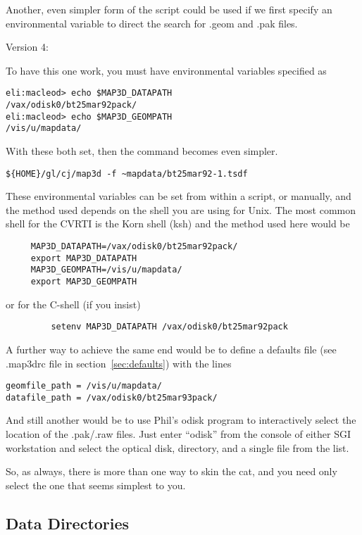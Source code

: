 Another, even simpler form of the script could be used if we first specify
an environmental variable to direct the search for .geom and .pak files.

\noindent
Version 4:

To have this one work, you must have environmental variables specified as

\begin{verbatim}
eli:macleod> echo $MAP3D_DATAPATH
/vax/odisk0/bt25mar92pack/
eli:macleod> echo $MAP3D_GEOMPATH
/vis/u/mapdata/
\end{verbatim}

With these both set, then the \map{} command becomes even simpler.

\begin{verbatim}
${HOME}/gl/cj/map3d -f ~mapdata/bt25mar92-1.tsdf 
\end{verbatim}

These environmental variables can be set from within a script, or manually,
and the method used depends on the shell you are using for Unix.  The most
common shell for the CVRTI is the Korn shell (ksh) and the method used here
would be

\begin{verbatim}
     MAP3D_DATAPATH=/vax/odisk0/bt25mar92pack/
     export MAP3D_DATAPATH
     MAP3D_GEOMPATH=/vis/u/mapdata/
     export MAP3D_GEOMPATH
\end{verbatim}
%
or for the C-shell (if you insist)
%
\begin{verbatim}
         setenv MAP3D_DATAPATH /vax/odisk0/bt25mar92pack
\end{verbatim}

A further way to achieve the same end would be to define a defaults file
(see .map3drc file in section~\ref{sec:defaults}) with the lines

\begin{verbatim}
geomfile_path = /vis/u/mapdata/
datafile_path = /vax/odisk0/bt25mar93pack/
\end{verbatim}

And still another would be to use Phil's odisk program to interactively
select the location of the .pak/.raw files.  Just enter ``odisk'' from the
console of either SGI workstation and select the optical disk, directory,
and a single file from the list.

So, as always, there is more than one way to skin the cat, and you need
only select the one that seems simplest to you.

\subsection{Data Directories}

